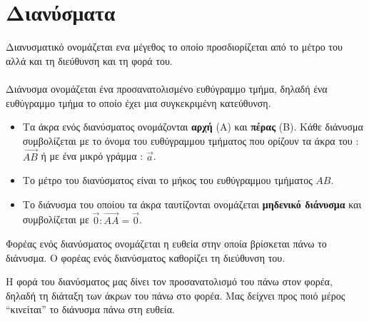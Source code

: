 \documentclass[twoside,nofonts,internet,shmeiwseis]{thewria}
\begin{document}
\section{Διανύσματα}
\orismoi
{}
Διανυσματικό ονομάζεται ενα μέγεθος το οποίο προσδιορίζεται από το μέτρο του αλλά και τη διεύθυνση και τη φορά του.\\\\
Διάνυσμα ονομάζεται ένα προσανατολισμένο ευθύγραμμο τμήμα, δηλαδή ένα ευθύγραμμο τμήμα το οποίο έχει μια συγκεκριμένη κατεύθυνση.
\begin{itemize}
\item Τα άκρα ενός διανύσματος ονομάζονται \textbf{αρχή} (Α) και \textbf{πέρας} (Β). Κάθε διάνυσμα συμβολίζεται με το όνομα του ευθύγραμμου τμήματος που ορίζουν τα άκρα του : $  \overrightarrow{AB}$ ή με ένα μικρό γράμμα : $ \vec{a} $.
\item Το μέτρο του διανύσματος είναι το μήκος του ευθύγραμμου τμήματος $ ΑΒ $.
\item Το διάνυσμα του οποίου τα άκρα ταυτίζονται ονομάζεται \textbf{μηδενικό διάνυσμα} και συμβολίζεται με $ \vec{0} : \overrightarrow{AA}=\vec{0}$.
\end{itemize}
Φορέας ενός διανύσματος ονομάζεται η ευθεία στην οποία βρίσκεται πάνω το διάνυσμα. Ο φορέας ενός διανύσματος καθορίζει τη διεύθυνση του. 
\begin{center}
\end{center}
Η φορά του διανύσματος μας δίνει τον προσανατολισμό του πάνω στον φορέα, δηλαδή τη διάταξη των άκρων του πάνω στο φορέα. Μας δείχνει προς ποιό μέρος \textquotedblleft κινείται\textquotedblright\; το διάνυσμα πάνω στη ευθεία.\\\\
\end{document}
